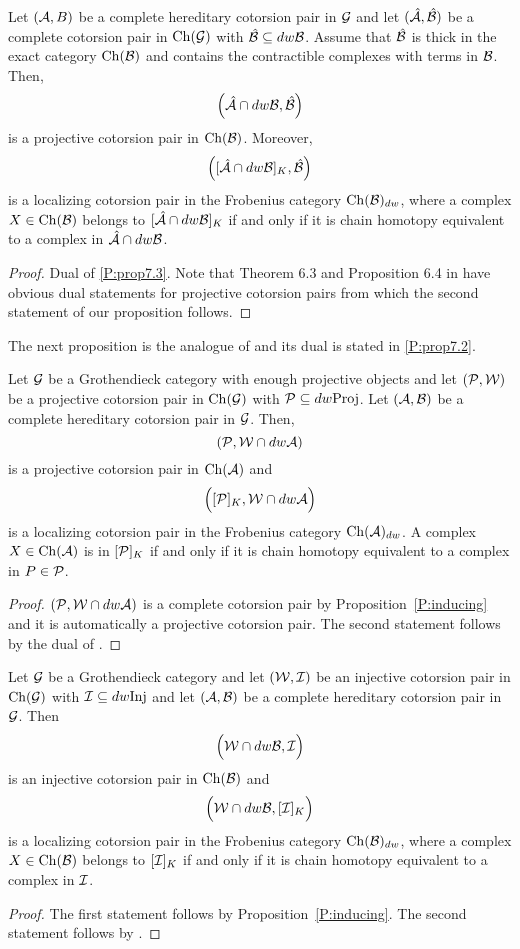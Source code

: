 %
\begin{prop}\label{P:prop7.3-dual} Let $(\mathcal{A}, B)$ be a complete hereditary cotorsion pair in $\mathcal{G}$ and let $(\hat{\mathcal{A}}, \hat{\mathcal{B}})$ be a complete cotorsion pair in $\mathrm{Ch}(\mathcal{G})$ with $\hat{\mathcal{B}}\subseteq dw\mathcal{B}$. Assume that $\hat{\mathcal{B}}$ is thick in the exact category $\mathrm{Ch}(\mathcal{B})$ and contains the contractible complexes with terms in $\mathcal{B}$.
Then, \[\Big(\hat{\mathcal{A}}\cap dw \mathcal{B}, \hat{\mathcal{B}}\Big)\] is a projective cotorsion pair in $\mathrm{Ch}(\mathcal{B})$.
Moreover,  \[\Big([\hat{\mathcal{A}}\cap dw \mathcal{B}]_K, \hat{\mathcal{B}}\Big)\] is a localizing cotorsion pair  in the Frobenius category $\mathrm{Ch}(\mathcal{B})_{dw}$,  where a complex $X\in \mathrm{Ch}(\mathcal{B})$ belongs to $[\hat{\mathcal{A}}\cap dw \mathcal{B}]_K$ if and only if it is chain homotopy equivalent to a complex in  $\hat{\mathcal{A}}\cap dw \mathcal{B}$.
\end{prop}
%
\begin{proof}
  Dual of \ref{P:prop7.3}.
Note that Theorem 6.3 and Proposition 6.4 in \cite{G7} have  obvious dual statements for projective cotorsion pairs from which the second statement of our proposition follows.\end{proof}

The next proposition is the analogue of \cite[Proposition 7.2 ]{G7} and its dual is stated in \ref{P:prop7.2}.

 \begin{prop}\label{P:7.2-Groth} Let $\mathcal{G}$ be a Grothendieck category with enough projective objects and let $(\mathcal{P}, \mathcal{W})$ be a projective cotorsion pair in $\mathrm{Ch}(\mathcal{G})$ with $\mathcal{P}\subseteq dw\mathrm{Proj}$.
 Let $(\mathcal{A}, \mathcal{B})$ be a complete hereditary cotorsion pair in $\mathcal{G}$. Then,
 \[(\mathcal{P}, \mathcal{W}\cap dw\mathcal{A})\] is a projective cotorsion pair in $\mathrm{Ch}(\mathcal{A})$ and \[\Big([\mathcal{P}]_K, \mathcal{W}\cap dw \mathcal{A}\Big)\] is a localizing cotorsion pair in the Frobenius category $\mathrm{Ch}(\mathcal{A})_{dw}$. A complex $X\in \mathrm{Ch}(\mathcal{A})$ is in $[\mathcal{P}]_K$ if and only if it is chain homotopy equivalent to a complex in $P\in \mathcal{P}$.
 \end{prop}
 \begin{proof} $(\mathcal{P}, \mathcal{W}\cap dw\mathcal{A})$ is a complete cotorsion pair by Proposition~\ref{P:inducing} and it is automatically a projective cotorsion pair. The second statement follows by the dual of \cite[Theorem 6.3, Proposition 6.4]{G7}.
\end{proof}


\begin{prop}\label{P:prop7.2} Let $\mathcal{G}$ be a Grothendieck category and let $(\mathcal{W}, \mathcal{I})$ be an injective cotorsion pair in $\mathrm{Ch}(\mathcal{G})$ with $\mathcal{I}\subseteq dw \mathrm{Inj}$ and let $(\mathcal{A}, \mathcal{B})$ be a complete hereditary cotorsion pair in $\mathcal{G}$. Then \[\Big(\mathcal{W}\cap dw \mathcal{B}, \mathcal{I}\Big)\] is an injective cotorsion pair in $\mathrm{Ch}(\mathcal{B})$ and \[\Big(\mathcal{W}\cap dw \mathcal{B}, [\mathcal{I}]_K\Big)\] is a localizing cotorsion pair in the Frobenius category $\mathrm{Ch}(\mathcal{B})_{dw}$, where a complex $X\in \mathrm{Ch}(\mathcal{B})$ belongs to $[\mathcal{I}]_K$ if and only if it is chain homotopy equivalent to a complex in $\mathcal{I}$.
\end{prop}

%
\begin{proof} The first statement follows by Proposition~\ref{P:inducing}. The second statement follows by \cite[Theorem 6.3]{G7}.
\end{proof}



%
%
%


